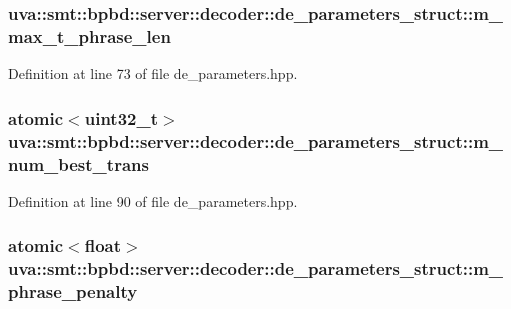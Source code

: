 \subsubsection[{m\+\_\+max\+\_\+t\+\_\+phrase\+\_\+len}]{ uva\+::smt\+::bpbd\+::server\+::decoder\+::de\+\_\+parameters\+\_\+struct\+::m\+\_\+max\+\_\+t\+\_\+phrase\+\_\+len}\label{structuva_1_1smt_1_1bpbd_1_1server_1_1decoder_1_1de__parameters__struct_a08635a97c1267f0b5c0e50044728a31f}


Definition at line 73 of file de\+\_\+parameters.\+hpp.

\hypertarget{structuva_1_1smt_1_1bpbd_1_1server_1_1decoder_1_1de__parameters__struct_ae4c10b88dd8010dc8db2fe9b443b8826}{}
\subsubsection[{m\+\_\+num\+\_\+best\+\_\+trans}]{\setlength{\rightskip}{0pt plus 5cm}atomic$<$uint32\+\_\+t$>$ uva\+::smt\+::bpbd\+::server\+::decoder\+::de\+\_\+parameters\+\_\+struct\+::m\+\_\+num\+\_\+best\+\_\+trans}\label{structuva_1_1smt_1_1bpbd_1_1server_1_1decoder_1_1de__parameters__struct_ae4c10b88dd8010dc8db2fe9b443b8826}


Definition at line 90 of file de\+\_\+parameters.\+hpp.

\hypertarget{structuva_1_1smt_1_1bpbd_1_1server_1_1decoder_1_1de__parameters__struct_ac478cd324467eba844b08e20cbe08d34}{}
\subsubsection[{m\+\_\+phrase\+\_\+penalty}]{\setlength{\rightskip}{0pt plus 5cm}atomic$<$float$>$ uva\+::smt\+::bpbd\+::server\+::decoder\+::de\+\_\+parameters\+\_\+struct\+::m\+\_\+phrase\+\_\+penalty}\label{structuva_1_1smt_1_1bpbd_1_1server_1_1decoder_1_1de__parameters__struct_ac478cd324467eba844b08e20cbe08d34}


